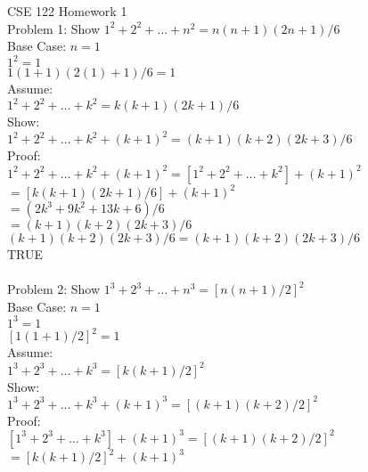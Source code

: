 \documentclass[12pt]{article}
\title{}
\author{Marci McBride}
\begin{document}
\maketitle 
        CSE 122 Homework 1
        \\ Problem 1: Show $1^2 + 2^2 + \ldots + n^2 = n(n+1)(2n+1)/6$
        \\
        \indent Base Case: $n = 1$
        \\\indent \indent $1^2 = 1$
        \\\indent \indent $1(1+1)(2(1)+1)/6=1 $
        \\\indent Assume:
        \\\indent \indent $1^2 + 2^2 + \ldots + k^2 = k(k+1)(2k+1)/6$
        \\\indent Show:
        \\\indent \indent $1^2 + 2^2 + \ldots + k^2 + (k+1)^2 = (k+1)(k+2)(2k+3)/6$
        \\\indent Proof:
        \\\indent \indent$1^2 + 2^2 + \ldots + k^2 + (k+1)^2  = [1^2 + 2^2 + \ldots + k^2 ] + (k+1)^2$
        \\\indent \indent$=[k(k+1)(2k+1)/6] + (k+1)^2$
        \\\indent \indent $=(2k^3+9k^2+13k+6)/6 $
        \\\indent \indent $=(k+1)(k+2)(2k+3)/6$
        \\\indent \indent $(k+1)(k+2)(2k+3)/6 =(k+1)(k+2)(2k+3)/6$
        \\\indent \indent TRUE
        \\
        \\Problem 2: Show  $1^3 + 2^3 + \ldots + n^3 = [n(n+1)/2]^2$
        \\\indent Base Case: $n = 1$
        \\\indent \indent $1^3 = 1 $
        \\\indent \indent $[1(1+1)/2]^2 =1$
        \\\indent Assume: 
        \\\indent \indent $1^3 + 2^3 + \ldots + k^3 = [k(k+1)/2]^2$
        \\\indent Show:
        \\\indent \indent $1^3 + 2^3 + \ldots + k^3 + (k+1)^3 = [(k+1)(k+2)/2]^2$
        \\\indent Proof:
        \\\indent \indent $[1^3 + 2^3 + \ldots + k^3] + (k+1)^3 = [(k+1)(k+2)/2]^2$
        \\\indent \indent $=[k(k+1)/2]^2+ (k+1)^3$
\end{document}

